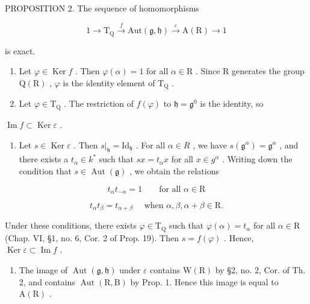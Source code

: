 PROPOSITION 2. The sequence of homomorphisms

\[
1 \longrightarrow \mathrm {T_ {Q}} \stackrel {f} {\longrightarrow} \mathrm{Aut} (\mathfrak {g}, \mathfrak {h}) \stackrel {\varepsilon} {\longrightarrow} \mathrm{A(R)} \longrightarrow 1
\]

is exact.

\begin{enumerate}
\def\labelenumi{\alph{enumi})}
\item
  Let \(\varphi \in \operatorname{Ker} f\) . Then \(\varphi(\alpha) = 1\) for all \(\alpha \in \mathrm{R}\) . Since \(\mathrm{R}\) generates the group \(\mathrm{Q}(\mathrm{R})\) , \(\varphi\) is the identity element of \(\mathrm{T}_{\mathrm{Q}}\) .
\item
  Let \(\varphi \in \mathrm{T}_{\mathrm{Q}}\) . The restriction of \(f(\varphi)\) to \(\mathfrak{h} = \mathfrak{g}^0\) is the identity, so
\end{enumerate}

\(\operatorname{Im} f \subset \operatorname{Ker} \varepsilon\) .

\begin{enumerate}
\def\labelenumi{\alph{enumi})}
\setcounter{enumi}{2}
\tightlist
\item
  Let \(s \in \operatorname{Ker} \varepsilon\) . Then \(s|_{\mathfrak{h}} = \mathrm{Id}_{\mathfrak{h}}\) . For all \(\alpha \in R\) , we have \(s(\mathfrak{g}^{\alpha}) = \mathfrak{g}^{\alpha}\) , and there exists a \(t_{\alpha} \in k^{*}\) such that \(sx = t_{\alpha}x\) for all \(x \in g^{\alpha}\) . Writing down the condition that \(s \in \operatorname{Aut}(\mathfrak{g})\) , we obtain the relations
\end{enumerate}

\[
t _ {\alpha} t _ {- \alpha} = 1 \qquad \text{for all } \alpha \in \mathrm{R}
\]

\[
t _ {\alpha} t _ {\beta} = t _ {\alpha + \beta} \quad \text { when } \alpha , \beta , \alpha + \beta \in \mathrm{R}.
\]

Under these conditions, there exists \(\varphi \in \mathrm{T}_{\mathrm{Q}}\) such that \(\varphi (\alpha) = t_{\alpha}\) for all \(\alpha \in \mathrm{R}\) (Chap. VI, §1, no. 6, Cor. 2 of Prop. 19). Then \(s = f(\varphi)\) . Hence, \(\operatorname{Ker} \varepsilon \subset \operatorname{Im} f\) .

\begin{enumerate}
\def\labelenumi{\alph{enumi})}
\setcounter{enumi}{3}
\tightlist
\item
  The image of \(\operatorname{Aut}(\mathfrak{g},\mathfrak{h})\) under \(\varepsilon\) contains \(\mathrm{W}(\mathrm{R})\) by §2, no. 2, Cor. of Th. 2, and contains \(\operatorname{Aut}(\mathrm{R},\mathrm{B})\) by Prop. 1. Hence this image is equal to \(\mathrm{A}(\mathrm{R})\) .
\end{enumerate}

